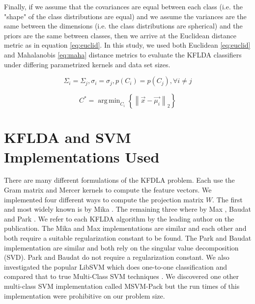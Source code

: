 \documentclass[journal]{IEEEtran}
\DeclareMathOperator*{\argmin}{arg\,min}
\begin{document}
\par Finally, if we assume that the covariances are equal between each class (i.e. the "shape" of the class distributions are equal) and we assume the variances are the same between the dimensions (i.e. the class distributions are spherical) and the priors are the same between classes, then we arrive at the Euclidean distance metric as in equation \ref{eq:euclid}. In this study, we used both Euclidean \ref{eq:euclid} and Mahalanobis \ref{eq:maha} distance metrics to evaluate the KFLDA classifiers under differing parametrized kernels and data set sizes.

\begin{equation}
\label{eq:assume}
\Sigma_i = \Sigma_j, \sigma_i = \sigma_j, p(C_i) = p(C_j), \forall i \ne j
\end{equation}

\begin{equation}
\label{eq:euclid}
C^* = \argmin_{C_i} \left\{ \left\|\vec{x} - \vec{\mu_i} \right\|_2 \right\}
\end{equation}

\section{KFLDA and SVM Implementations Used}
\par There are many different formulations of the KFDLA problem. Each use the Gram matrix and Mercer kernels to compute the feature vectors. We implemented four different ways to compute the projection matrix \(W\). The first and most widely known is by Mika \cite{mika}. The remaining three where by Max \cite{max}, Baudat \cite{baudat} and Park \cite{park}. We refer to each KFLDA algorithm by the leading author on the publication. The Mika and Max implementations are similar and each other and both require a suitable regularization constant to be found. The Park and Baudat implementation are similar and both rely on the singular value decomposition (SVD). Park and Baudat do not require a regularization constant. We also investigated the popular LibSVM \cite{libsvm} which does one-to-one classification and compared that to true Multi-Class SVM techniques \cite{mcsvm}. We discovered one other multi-class SVM implementation called MSVM-Pack \cite{msvmpack} but the run times of this implementation were prohibitive on our problem size.
\end{document}

